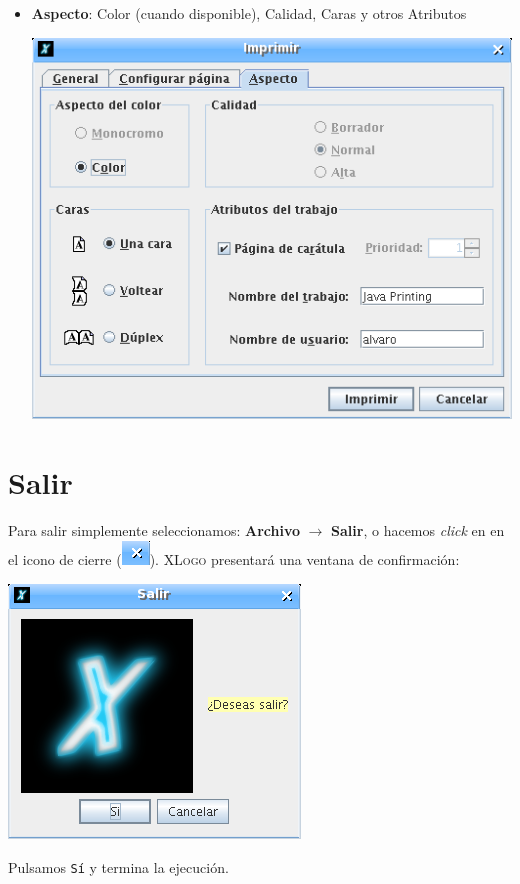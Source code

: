 \begin{itemize}
\begin{center}
      \end{center}
   \item \textbf{Aspecto}: Color (cuando disponible), Calidad, Caras y otros
      Atributos 
      \begin{center}
         \includegraphics[scale=0.3]{Imagenes/02_Caracteristicas/VentanaImpresion_03.png}
      \end{center}
\end{itemize}

\section{Salir}
   \label{Salir}

Para salir simplemente seleccionamos: \textbf{Archivo} $\rightarrow$ \textbf{Salir},
o hacemos \textit{click} en en el icono de cierre 
(\includegraphics[scale=0.4]{Imagenes/02_Caracteristicas/cerrar.png}). \textsc{XLogo} presentar\'a
una ventana de confirmaci\'on: 
\begin{center}
   \includegraphics[scale=0.4]{Imagenes/02_Caracteristicas/SalirXLogo.png}
\end{center}
Pulsamos \texttt{S\'i} y termina la ejecuci\'on.
